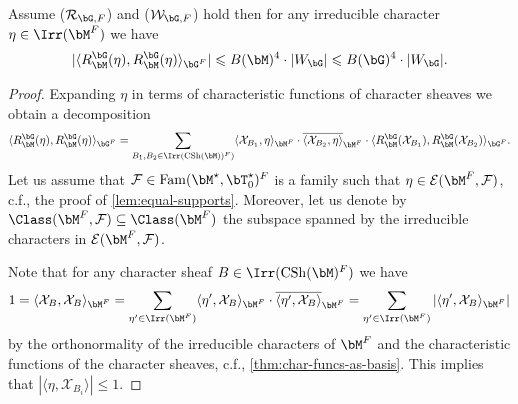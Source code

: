\documentclass[eqthmnum,nocolour,skinny]{jt-calcs}
\DeclareMathOperator{\CS}{CSh}
\DeclareMathOperator{\Fam}{Fam}
\begin{document}
\begin{prop}\label{prop:multiplicities}
Assume ($\mathcal{R}_{\bG,F}$) and ($\mathcal{W}_{\bG,F}$) hold then for any irreducible character $\eta \in \Irr(\bM^F)$ we have
\begin{equation*}
|\langle R_{\bM}^{\bG}(\eta), R_{\bM}^{\bG}(\eta)\rangle_{\bG^F}| \leqslant B(\bM)^4\cdot |W_{\bG}| \leqslant B(\bG)^4\cdot |W_{\bG}|.
\end{equation*}
\end{prop}

\begin{proof}
Expanding $\eta$ in terms of characteristic functions of character sheaves we obtain a decomposition
\begin{equation*}
\langle R_{\bM}^{\bG}(\eta), R_{\bM}^{\bG}(\eta)\rangle_{\bG^F} = \sum_{B_1,B_2 \in \Irr(\CS(\bM))^F)}\langle \mathcal{X}_{B_1},\eta \rangle_{\bM^F}\cdot\overline{\langle \mathcal{X}_{B_2}, \eta\rangle}_{\bM^F}\cdot\langle R_{\bM}^{\bG}(\mathcal{X}_{B_1}), R_{\bM}^{\bG}(\mathcal{X}_{B_2})\rangle_{\bG^F}.
\end{equation*}
Let us assume that $\mathcal{F} \in \Fam(\bM^{\star},\bT_0^{\star})^F$ is a family such that $\eta \in \mathcal{E}(\bM^F,\mathcal{F})$, c.f., the proof of \cref{lem:equal-supports}. Moreover, let us denote by $\Class(\bM^F,\mathcal{F}) \subseteq \Class(\bM^F)$ the subspace spanned by the irreducible characters in $\mathcal{E}(\bM^F,\mathcal{F})$.

Note that for any character sheaf $B \in \Irr(\CS(\bM)^F)$ we have
\begin{equation*}
1 = \langle \mathcal{X}_B,\mathcal{X}_B\rangle_{\bM^F} = \sum_{\eta' \in \Irr(\bM^F)} \langle \eta',\mathcal{X}_B\rangle_{\bM^F}\cdot\overline{\langle \eta',\mathcal{X}_B\rangle}_{\bM^F} = \sum_{\eta' \in \Irr(\bM^F)} |\langle \eta',\mathcal{X}_B\rangle_{\bM^F}|
\end{equation*}
by the orthonormality of the irreducible characters of $\bM^F$ and the characteristic functions of the character sheaves, c.f., \cref{thm:char-funcs-as-basis}. This implies that $|\langle \eta,\mathcal{X}_{B_i}\rangle| \leqslant 1$.


\end{proof}
\end{document}

